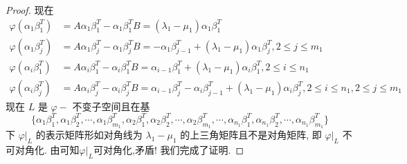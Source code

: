 \documentclass[../../main.tex]{subfiles}
\begin{document}
\begin{proof}
现在
\begin{align*}
\varphi(\alpha_1 \beta_1^T) &= A\alpha_1 \beta_1^T - \alpha_1 \beta_1^T B = (\lambda_1 - \mu_1) \alpha_1 \beta_1^T \\
\varphi(\alpha_1 \beta_j^T) &= A\alpha_1 \beta_j^T - \alpha_1 \beta_j^T B = -\alpha_1 \beta_{j - 1}^T + (\lambda_1 - \mu_1) \alpha_1 \beta_j^T, 2 \leqslant  j \leqslant  m_1 \\
\varphi(\alpha_i \beta_1^T) &= A\alpha_i \beta_1^T - \alpha_i \beta_1^T B = \alpha_{i - 1} \beta_1^T + (\lambda_1 - \mu_1) \alpha_i \beta_1^T, 2 \leqslant  i \leqslant  n_1 \\
\varphi(\alpha_i \beta_j^T) &= A\alpha_i \beta_j^T - \alpha_i \beta_j^T B = \alpha_{i - 1} \beta_j^T - \alpha_i \beta_{j - 1}^T + (\lambda_1 - \mu_1) \alpha_i \beta_j^T, 2 \leqslant  i \leqslant  n_1, 2 \leqslant  j \leqslant  m_1
\end{align*}
现在 $L$ 是 $\varphi-$ 不变子空间且在基
$$\{\alpha_1 \beta_1^T, \alpha_1 \beta_2^T, \cdots, \alpha_1 \beta_{m_1}^T, \alpha_2 \beta_1^T, \alpha_2 \beta_2^T, \cdots, \alpha_2 \beta_{m_1}^T, \cdots, \alpha_{n_1} \beta_1^T, \alpha_{n_1} \beta_2^T, \cdots, \alpha_{n_1} \beta_{m_1}^T\}$$
下 $\varphi|_L$ 的表示矩阵形如对角线为 $\lambda_1 - \mu_1$ 的上三角矩阵且不是对角矩阵, 即 $\varphi|_L$ 不可对角化. 由可知$\varphi|_L$可对角化,矛盾!
我们完成了证明.

\end{proof}
\end{document}

